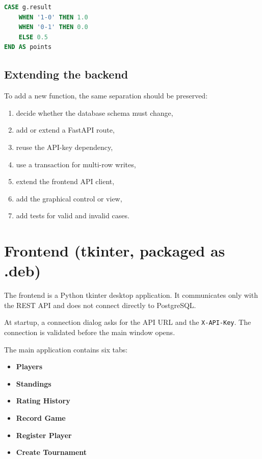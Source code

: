 \documentclass[11pt,a4paper]{article}
\begin{document}
\begin{lstlisting}[language=SQL, caption={Simplified scoring logic used for standings}]
CASE g.result
    WHEN '1-0' THEN 1.0
    WHEN '0-1' THEN 0.0
    ELSE 0.5
END AS points
\end{lstlisting}

\subsection{Extending the backend}

To add a new function, the same separation should be preserved:

\begin{enumerate}[leftmargin=1.6em, topsep=2pt]
  \item decide whether the database schema must change,
  \item add or extend a FastAPI route,
  \item reuse the API-key dependency,
  \item use a transaction for multi-row writes,
  \item extend the frontend API client,
  \item add the graphical control or view,
  \item add tests for valid and invalid cases.
\end{enumerate}

\section{Frontend (tkinter, packaged as .deb)}

The frontend is a Python tkinter desktop application. It communicates only with
the REST API and does not connect directly to PostgreSQL.

At startup, a connection dialog asks for the API URL and the
\texttt{X-API-Key}. The connection is validated before the main window opens.

The main application contains six tabs:

\begin{itemize}[leftmargin=1.4em]
  \item \textbf{Players}
  \item \textbf{Standings}
  \item \textbf{Rating History}
  \item \textbf{Record Game}
  \item \textbf{Register Player}
  \item \textbf{Create Tournament}
\end{itemize}
\end{document}
